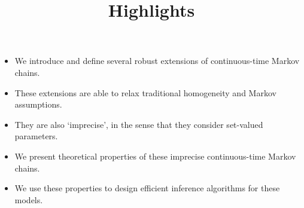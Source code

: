 \documentclass{article}
\title{Highlights}
\author{}
\begin{document}
\date{}
\maketitle

\begin{itemize}
\item We introduce and define several robust extensions of continuous-time Markov chains.
\item These extensions are able to relax traditional homogeneity and Markov assumptions.
\item They are also `imprecise', in the sense that they consider set-valued parameters.
\item We present theoretical properties of these imprecise continuous-time Markov chains.
\item We use these properties to design efficient inference algorithms for these models.
\end{itemize}
\end{document}
